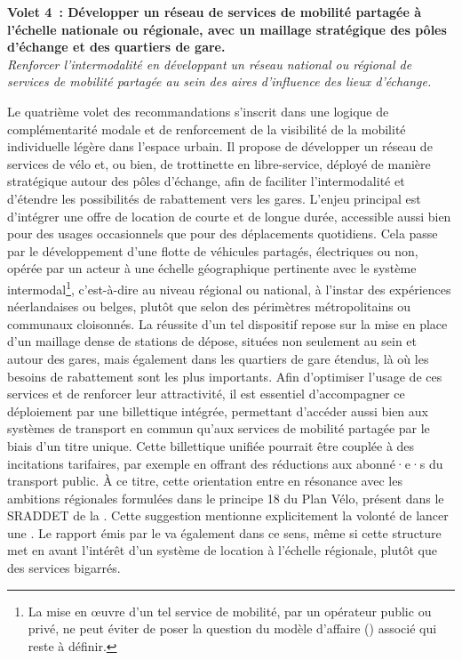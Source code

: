 \begin{refsegment}
    \begin{displayquote}
\textbf{Volet 4~: Développer un réseau de services de mobilité partagée à l'échelle nationale ou régionale, avec un maillage stratégique des pôles d'échange et des quartiers de gare.}
\\
\textsl{Renforcer l’intermodalité en développant un réseau national ou régional de services de mobilité partagée au sein des aires d'influence des lieux d'échange.}
    \end{displayquote}
Le quatrième volet des recommandations s’inscrit dans une logique de complémentarité modale et de renforcement de la visibilité de la mobilité individuelle légère dans l’espace urbain. Il propose de développer un réseau de services de vélo et, ou bien, de trottinette en libre-service, déployé de manière stratégique autour des pôles d’échange, afin de faciliter l’intermodalité et d’étendre les possibilités de rabattement vers les gares. L’enjeu principal est d’intégrer une offre de location de courte et de longue durée, accessible aussi bien pour des usages occasionnels que pour des déplacements quotidiens. Cela passe par le développement d'une flotte de véhicules partagés, électriques ou non, opérée par un acteur à une échelle géographique pertinente avec le système intermodal\footnote{
    La mise en œuvre d'un tel service de mobilité, par un opérateur public ou privé, ne peut éviter de poser la question du modèle d'affaire () associé qui reste à définir.
}, c’est-à-dire au niveau régional ou national, à l'instar des expériences néerlandaises ou belges, plutôt que selon des périmètres métropolitains ou communaux cloisonnés. La réussite d’un tel dispositif repose sur la mise en place d’un maillage dense de stations de dépose, situées non seulement au sein et autour des gares, mais également dans les quartiers de gare étendus, là où les besoins de rabattement sont les plus importants. Afin d’optimiser l’usage de ces services et de renforcer leur attractivité, il est essentiel d’accompagner ce déploiement par une billettique intégrée, permettant d’accéder aussi bien aux systèmes de transport en commun qu’aux services de mobilité partagée par le biais d'un titre unique. Cette billettique unifiée pourrait être couplée à des incitations tarifaires, par exemple en offrant des réductions aux abonné·e·s du transport public. À ce titre, cette orientation entre en résonance avec les ambitions régionales formulées dans le principe 18 du Plan Vélo, présent dans le \acrfull{SRADDET} de la \textcolor{blue}{\textcite[40]{region_hauts-de-france_plan_2023}}. Cette suggestion mentionne explicitement la volonté de lancer une . Le rapport émis par le \textcolor{blue}{\textcite[75]{ceser_hauts-de-france_mobilite_2021}} va également dans ce sens, même si cette structure met en avant l'intérêt d'un système de location à l'échelle régionale, plutôt que des services bigarrés.%


\end{refsegment}
